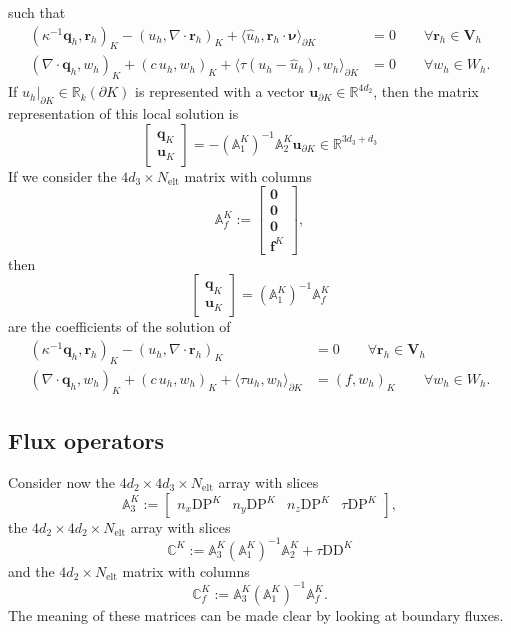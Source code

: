 \documentclass[10pt,english]{article}
\newcommand{\ds}{\displaystyle}
\newcommand{\Nelt}{{N_{\mathrm{elt}}}}
\begin{document}
such that
\[
\begin{array}{rl}
\ds (\kappa^{-1} \boldsymbol q_h,\boldsymbol r_h)_K  -(u_h,\nabla\cdot\boldsymbol r_h)_K  +\langle \widehat u_h,\boldsymbol r_h\cdot\boldsymbol\nu\rangle_{\partial K}&=0 \qquad \forall \boldsymbol r_h \in \boldsymbol V_h\\[1.5ex]
(\nabla\cdot\boldsymbol q_h,w_h)_K +(c\,u_h,w_h)_K +\langle \tau (u_h -\widehat u_h),w_h\rangle_{\partial K} &=0 \qquad \forall w_h \in W_h.
\end{array}
\]
If $\widehat u_h|_{\partial K}\in \mathbb R_k(\partial K)$ is represented with a vector $\mathbf u_{\partial K} \in \mathbb R^{4d_2}$, then the matrix representation of this local solution is
\[
\left[\begin{array}{c} \mathbf q_K \\ \mathbf u_K\end{array}\right]=-(\mathbb A_1^K)^{-1} \mathbb A_2^K \mathbf u_{\partial K} \in \mathbb R^{3d_3+d_3}
\]
If we consider the $4d_3\times \Nelt$ matrix with columns
\[
\mathbb A_f^K:=\left[\begin{array}{ccc} \mathbf 0 \\ \mathbf 0 \\ \mathbf 0\\ \mathbf f^K\end{array}\right],
\]
then
\[
\left[\begin{array}{c} \mathbf q_K \\ \mathbf u_K\end{array}\right]=(\mathbb A_1^K)^{-1}\mathbb A_f^K
\]
are the coefficients of the solution of 
\[
\begin{array}{rl}
\ds (\kappa^{-1} \boldsymbol q_h,\boldsymbol r_h)_K  -(u_h,\nabla\cdot\boldsymbol r_h)_K  &=0 \qquad \forall \boldsymbol r_h \in \boldsymbol V_h\\[1.5ex]
(\nabla\cdot\boldsymbol q_h,w_h)_K +(c\,u_h,w_h)_K +\langle \tau u_h ,w_h\rangle_{\partial K} &=(f,w_h)_K \qquad \forall w_h \in W_h.
\end{array}
\]

\subsection{Flux operators}

Consider now the $4d_2\times 4d_3\times \Nelt$ array with slices
\[
\mathbb A_3^K:=\left[\begin{array}{cccc} n_x\mathrm{DP}^K & n_y\mathrm{DP}^K & n_z\mathrm{DP}^K &
\tau\mathrm{DP}^K\end{array}\right],
\]
the $4d_2\times 4d_2\times \Nelt$ array with slices
\[
\mathbb C^K:= \mathbb A_3^K ( \mathbb A_1^K)^{-1} \mathbb A_2^K+\tau\mathrm{DD}^K
\]
and the $4d_2\times \Nelt$ matrix with columns
\[
 \mathbb C_f^K:=\mathbb A_3^K (\mathbb A_1^K)^{-1}\mathbb A_f^K.
\]
The meaning of these matrices  can be made clear by looking at boundary fluxes. 
\end{document}
